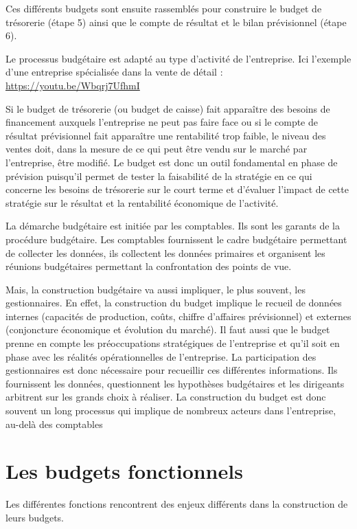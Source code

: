 \documentclass[oneside]{kaobook}
\begin{document}
Ces différents budgets sont ensuite rassemblés pour construire le budget de trésorerie (étape 5) ainsi que le compte de résultat et le bilan prévisionnel (étape 6).

\begin{kaobox}
Le processus budgétaire est adapté au type d'activité de l'entreprise. Ici l'exemple d'une entreprise spécialisée dans la vente de détail :
\url{https://youtu.be/Wbqrj7UfhmI}
\end{kaobox}

Si le budget de trésorerie (ou budget de caisse) fait apparaître des besoins de financement auxquels l'entreprise ne peut pas faire face ou si le compte de résultat prévisionnel fait apparaître une rentabilité trop faible, le niveau des ventes doit, dans la mesure de ce qui peut être vendu sur le marché par l'entreprise, être modifié. Le budget est donc un outil fondamental en phase de prévision puisqu'il permet de tester la faisabilité de la stratégie en ce qui concerne les besoins de trésorerie sur le court terme et d'évaluer l'impact de cette stratégie sur le résultat et la rentabilité économique de l'activité.

La démarche budgétaire est initiée par les comptables. Ils sont les garants de la procédure budgétaire. Les comptables fournissent le cadre budgétaire permettant de collecter les données, ils collectent les données primaires et organisent les réunions budgétaires permettant la confrontation des points de vue.

Mais, la construction budgétaire va aussi impliquer, le plus souvent, les gestionnaires. En effet, la construction du budget implique le recueil de données internes (capacités de production, coûts, chiffre d'affaires prévisionnel) et externes (conjoncture économique et évolution du marché). Il faut aussi que le budget prenne en compte les préoccupations stratégiques de l'entreprise et qu'il soit en phase avec les réalités opérationnelles de l'entreprise. La participation des gestionnaires est donc nécessaire pour recueillir ces différentes informations. Ils fournissent les données, questionnent les hypothèses budgétaires et les dirigeants arbitrent sur les grands choix à réaliser. 
La construction du budget est donc souvent un long processus qui implique de nombreux acteurs dans l'entreprise, au-delà des comptables

\section{Les budgets fonctionnels}
\label{sec:org9783212}
Les différentes fonctions rencontrent des enjeux différents dans la construction de leurs budgets.
\end{document}

